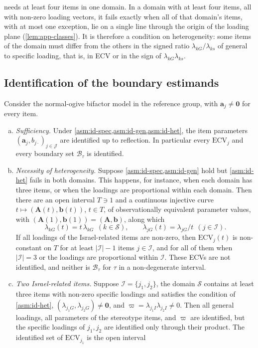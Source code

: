  needs at least four items in one domain. In a domain with at least four items, all with non-zero loading vectors, it fails exactly when all of that domain's items, with at most one exception, lie on a single line through the origin of the loading plane (\cref{lem:app-classes}). It is therefore a condition on heterogeneity: some items of the domain must differ from the others in the signed ratio $\lambda_{kG}/\lambda_{ks}$ of general to specific loading, that is, in ECV or in the sign of $\lambda_{kG}\lambda_{ks}$.

\subsection{Identification of the boundary estimands}\label{sec:id-ident}

\begin{theorem}[Identification]\label{thm:ident}
Consider the normal-ogive bifactor model in the reference group, with $\bm a_j\neq\bm0$ for every item.
\begin{enumerate}[(a)]
  \item \emph{Sufficiency.} Under \cref{asm:id-spec,asm:id-gen,asm:id-het}, the item parameters $(\bm a_j,b_{j\cdot})_{j\in\mathcal J}$ are identified up to reflection. In particular every $\mathrm{ECV}_j$ and every boundary set $\mathcal B_\tau$ is identified.
  \item \emph{Necessity of heterogeneity.} Suppose \cref{asm:id-spec,asm:id-gen} hold but \cref{asm:id-het} fails in both domains. This happens, for instance, when each domain has three items, or when the loadings are proportional within each domain. Then there are an open interval $T\ni1$ and a continuous injective curve $t\mapsto(\bm A(t),\bm b(t))$, $t\in T$, of observationally equivalent parameter values, with $(\bm A(1),\bm b(1))=(\bm A,\bm b)$, along which
  \begin{equation}\label{eq:id-curve}
    \lambda_{kG}(t)=t\,\lambda_{kG}\ \ (k\in\mathcal S),\qquad \lambda_{jG}(t)=\lambda_{jG}/t\ \ (j\in\mathcal I).
  \end{equation}
  If all loadings of the Israel-related items are non-zero, then $\mathrm{ECV}_j(t)$ is non-constant on $T$ for at least $|\mathcal I|-1$ items $j\in\mathcal I$, and for all of them when $|\mathcal I|=3$ or the loadings are proportional within $\mathcal I$. These ECVs are not identified, and neither is $\mathcal B_\tau$ for $\tau$ in a non-degenerate interval.
  \item \emph{Two Israel-related items.} Suppose $\mathcal I=\{j_1,j_2\}$, the domain $\mathcal S$ contains at least three items with non-zero specific loadings and satisfies the condition of \cref{asm:id-het}, $(\lambda_{j_1G},\lambda_{j_2G})\neq\bm0$, and $\varpi=\lambda_{j_1I}\lambda_{j_2I}\neq0$. Then all general loadings, all parameters of the stereotype items, and $\varpi$ are identified, but the specific loadings of $j_1,j_2$ are identified only through their product. The identified set of $\mathrm{ECV}_{j_1}$ is the open interval

\end{enumerate}
\end{theorem}
